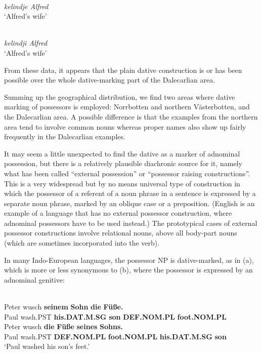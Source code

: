 \ex 
{}\\
\gl \textit{kelindje Alfred}\\
\glt ‘Alfred’s wife’

\ex 
{}\\
\gl \textit{kelindji Alfred}\\
\glt ‘Alfred’s wife’

\z 
\z



From these data, it appears that the plain dative construction is or has been possible over the whole dative-marking part of the Dalecarlian area. 

Summing up the geographical distribution, we find two areas where dative marking of possessors is employed: Norrbotten and northern Västerbotten, and the Dalecarlian area. A possible difference is that the examples from the northern area tend to involve common nouns whereas proper names also show up fairly frequently in the Dalecarlian examples. 

It may seem a little unexpected to find the dative as a marker of adnominal possession, but there is a relatively plausible diachronic source for it, namely what has been called “external possession” or “possessor raising constructions”. This is a very widespread but by no means universal type of construction in which the possessor of a referent of a noun phrase in a sentence is expressed by a separate noun phrase, marked by an oblique case or a preposition. (English is an example of a language that has no external possessor construction, where adnominal possessors have to be used instead.) The prototypical cases of external possessor constructions involve relational nouns, above all body-part nouns (which are sometimes incorporated into the verb).

In many Indo-European languages, the possessor NP is dative-marked, as in (a), which is more or less synonymous to (b), where the possessor is expressed by an adnominal genitive:

\ea\label{}
\\
\ea 
\gll Peter  wusch  \textbf{seinem} \textbf{Sohn} \textbf{die} \textbf{Füße.}\\
Paul  wash.PST  \textbf{his.DAT.M.SG} \textbf{son} \textbf{DEF.NOM.PL} \textbf{foot.NOM.PL}\\
\ex 
\gll Peter  wusch  \textbf{die} \textbf{Füße} \textbf{seines} \textbf{Sohns.}\\
Paul  wash.PST  \textbf{DEF.NOM.PL} \textbf{foot.NOM.PL} \textbf{his.DAT.M.SG} \textbf{son}\\
\glt ‘Paul washed his son’s feet.’
\z
\z 

